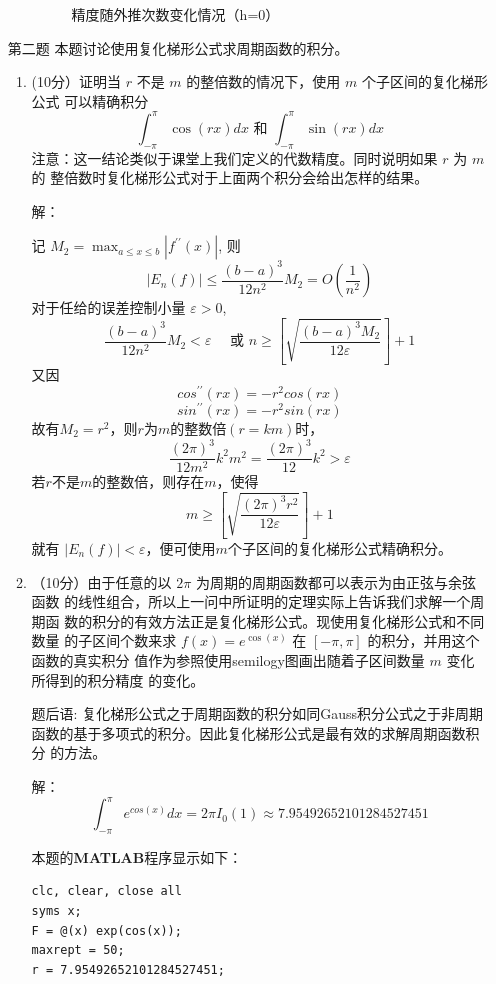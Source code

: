 \documentclass[12pt,a4paper,UTF8]{ctexart}
\theoremstyle{nonumberplain}
\begin{document}
\begin{enumerate}
\begin{enumerate}
\begin{figure}[H]
    \caption{精度随外推次数变化情况（h=0）}
\end{figure}
          \end{enumerate}
    \item[第二题] 本题讨论使用复化梯形公式求周期函数的积分。
          \begin{enumerate}
              \item
                    (10分）证明当 $r$ 不是 $m$ 的整倍数的情况下，使用 $m$ 个子区间的复化梯形公式
                    可以精确积分
                    $$
                        \int_{-\pi}^{\pi} \cos (r x) d x  \text { 和 }  \int_{-\pi}^{\pi} \sin (r x) d x
                    $$
                    注意：这一结论类似于课堂上我们定义的代数精度。同时说明如果 $r$ 为 $m$ 的
                    整倍数时复化梯形公式对于上面两个积分会给出怎样的结果。
                    \par 解：
                    \par 记 $M_{2}=\max _{a \leqslant x \leqslant b}\left|f^{\prime \prime}(x)\right|$, 则
                    $$
                    \left|E_{n}(f)\right| \leqslant \frac{(b-a)^{3}}{12 n^{2}} M_{2}=O\left(\frac{1}{n^{2}}\right)
                    $$
                    对于任给的误差控制小量 $\varepsilon>0$,
                    $$
                    \frac{(b-a)^{3}}{12 n^{2}} M_{2}<\varepsilon \quad \text { 或 } n \geqslant\left[\sqrt{\frac{(b-a)^{3} M_{2}}{12 \varepsilon}}\right]+1
                    $$
                    又因
                    $$cos^{\prime \prime}(rx)=-r^{2}cos(rx)$$ $$sin^{\prime \prime}(rx)=-r^{2}sin(rx)$$
                    故有$M_{2}=r^{2}$，则$r$为$m$的整数倍$(r=km)$时，
                    $$
                    \frac{(2\pi)^{3}}{12 m^{2}}k^{2} m^{2}= \frac{(2\pi)^{3}}{12}k^{2} > \varepsilon
                    $$
                    若$r$不是$m$的整数倍，则存在$m$，使得
                    $$m \geqslant\left[\sqrt{\frac{(2\pi)^{3} r^{2}}{12 \varepsilon}}\right]+1
$$就有 $\left|E_{n}(f)\right|<\varepsilon$，便可使用$m$个子区间的复化梯形公式精确积分。
              \item （10分）由于任意的以 $2 \pi$ 为周期的周期函数都可以表示为由正弦与余弦函数 的线性组合，所以上一问中所证明的定理实际上告诉我们求解一个周期函 数的积分的有效方法正是复化梯形公式。现使用复化梯形公式和不同数量 的子区间个数来求 $f(x)=e^{\cos (x)}$ 在 $[-\pi, \pi]$ 的积分，并用这个函数的真实积分 值作为参照使用semilogy图画出随着子区间数量 $m$ 变化所得到的积分精度 的变化。
                    \par 题后语: 复化梯形公式之于周期函数的积分如同Gauss积分公式之于非周期
                    函数的基于多项式的积分。因此复化梯形公式是最有效的求解周期函数积分 的方法。
                    \par 解：
                    $$\int_{-\pi}^{\pi} e^{cos(x)} dx =  2\pi I_0(1)\approx 7.95492652101284527451$$
                    \par 本题的\textbf{MATLAB}程序显示如下：
                    \begin{lstlisting}[frame=single]
clc, clear, close all
syms x;
F = @(x) exp(cos(x));
maxrept = 50;
r = 7.95492652101284527451;


\end{lstlisting}
\end{enumerate}
\end{enumerate}
\end{document}
